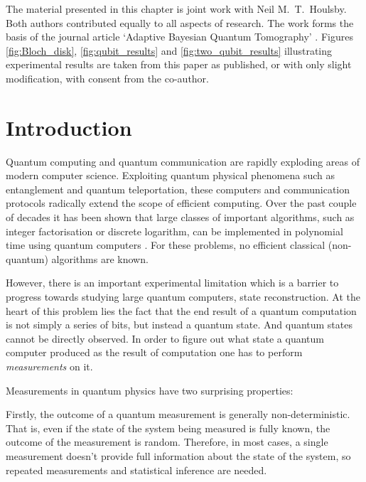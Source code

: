 
\begin{summarycontributions}
 The material presented in this chapter is joint work with Neil M.\ T.\ Houlsby. Both authors contributed equally to all aspects of research. The work forms the basis of the journal article `Adaptive Bayesian Quantum Tomography' \citep{Huszar2012quantum}. Figures \ref{fig:Bloch_disk}, \ref{fig:qubit_results} and \ref{fig:two_qubit_results} illustrating experimental results are taken from this paper as published, or with only slight modification, with consent from the co-author.
\end{summarycontributions}

\section{Introduction}

Quantum computing and quantum communication are rapidly exploding areas of modern computer science. Exploiting quantum physical phenomena such as entanglement and quantum teleportation, these computers and communication protocols radically extend the scope of efficient computing. Over the past couple of decades it has been shown that large classes of important algorithms, such as integer factorisation or discrete logarithm, can be implemented in polynomial time using quantum computers \citep{Shor1994,Shor1997}. For these problems, no efficient classical (non-quantum) algorithms are known.

However, there is an important experimental limitation which is a barrier to progress towards studying large quantum computers, state reconstruction. At the heart of this problem lies the fact that the end result of a quantum computation is not simply a series of bits, but instead a quantum state. And quantum states cannot be directly observed. In order to figure out what state a quantum computer produced as the result of computation one has to perform \emph{measurements} on it.

Measurements in quantum physics have two surprising properties:

Firstly, the outcome of a quantum measurement is generally non-deterministic. That is, even if the state of the system being measured is fully known, the outcome of the measurement is random. Therefore, in most cases, a single measurement doesn't provide full information about the state of the system, so repeated measurements and statistical inference are needed.

